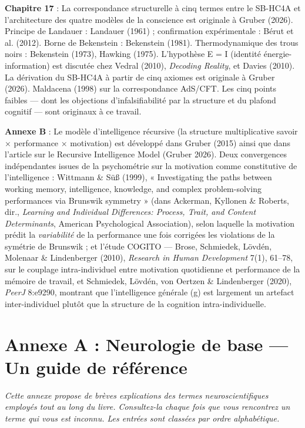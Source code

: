 \documentclass[11pt, twoside, openright]{book}
\begin{document}
\textbf{Chapitre 17} : La correspondance structurelle à cinq termes entre le SB-HC4A et l'architecture des quatre modèles de la conscience est originale à Gruber (2026). Principe de Landauer : Landauer (1961) ; confirmation expérimentale : Bérut et al. (2012). Borne de Bekenstein : Bekenstein (1981). Thermodynamique des trous noirs : Bekenstein (1973), Hawking (1975). L'hypothèse E = I (identité énergie-information) est discutée chez Vedral (2010), \textit{Decoding Reality}, et Davies (2010). La dérivation du SB-HC4A à partir de cinq axiomes est originale à Gruber (2026). Maldacena (1998) sur la correspondance AdS/\allowbreak{}CFT. Les cinq points faibles --- dont les objections d'infalsifiabilité par la structure et du plafond cognitif --- sont originaux à ce travail.

\textbf{Annexe B} : Le modèle d'intelligence récursive (la structure multiplicative savoir × performance × motivation) est développé dans Gruber (2015) ainsi que dans l'article sur le Recursive Intelligence Model (Gruber 2026). Deux convergences indépendantes issues de la psychométrie sur la motivation comme constitutive de l'intelligence : Wittmann \& Süß (1999), « Investigating the paths between working memory, intelligence, knowledge, and complex problem-solving performances via Brunswik symmetry » (dans Ackerman, Kyllonen \& Roberts, dir., \textit{Learning and Individual Differences: Process, Trait, and Content Determinants}, American Psychological Association), selon laquelle la motivation prédit la \textit{variabilité} de la performance une fois corrigées les violations de la symétrie de Brunswik ; et l'étude COGITO --- Brose, Schmiedek, Lövdén, Molenaar \& Lindenberger (2010), \textit{Research in Human Development} 7(1), 61--78, sur le couplage intra-individuel entre motivation quotidienne et performance de la mémoire de travail, et Schmiedek, Lövdén, von Oertzen \& Lindenberger (2020), \textit{PeerJ} 8:e9290, montrant que l'intelligence générale (g) est largement un artefact inter-individuel plutôt que la structure de la cognition intra-individuelle.


\chapter*{Annexe A : Neurologie de base --- Un guide de référence}

\textit{Cette annexe propose de brèves explications des termes neuroscientifiques employés tout au long du livre. Consultez-la chaque fois que vous rencontrez un terme qui vous est inconnu. Les entrées sont classées par ordre alphabétique.}
\end{document}
